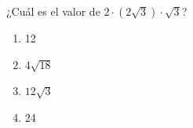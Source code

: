 \begin{problem}
    ¿Cuál es el valor de $2 \cdot (2\sqrt{3}) \cdot \sqrt{3}$?

    \begin{enumerate}[label=\Alph*.]
        \item 12
        \item $4\sqrt{18}$
        \item $12\sqrt{3}$
        \item 24
    \end{enumerate}
\end{problem}
